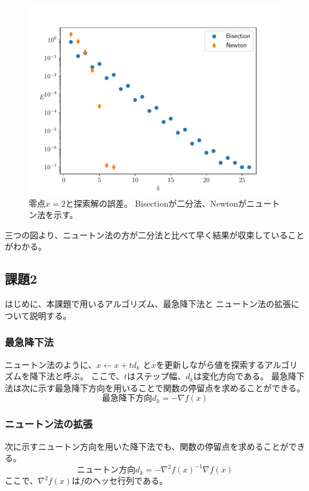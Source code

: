 \documentclass[a4j, titlepage]{jsarticle}
\numberwithin{equation}{section}
\begin{document}
            \begin{figure}[h]
                \centering
                \includegraphics[width=0.8\hsize]{kadai1/change2.pdf}
                \caption{
                    零点$x=2$と探索解の誤差。
                    Bisectionが二分法、Newtonがニュートン法を示す。
                }
                \label{fig:1fe2}
            \end{figure}

            三つの図より、ニュートン法の方が二分法と比べて早く結果が収束していることがわかる。

    \subsection{課題2} \label{sec:kadai2}
        はじめに、本課題で用いるアルゴリズム、最急降下法と
        ニュートン法の拡張について説明する。

        \subsubsection{最急降下法}
            ニュートン法のように、$x\leftarrow x+td_k$
            と$x$を更新しながら値を探索するアルゴリズムを降下法と呼ぶ。
            ここで、$t$はステップ幅、$d_k$は変化方向である。
            最急降下法は次に示す最急降下方向を用いることで関数の停留点を求めることができる。
            \begin{equation*}
                最急降下方向 d_k=-\nabla f(x)
            \end{equation*}

        \subsubsection{ニュートン法の拡張}
            次に示すニュートン方向を用いた降下法でも、関数の停留点を求めることができる。
            \begin{equation*}
                ニュートン方向 d_k=-\nabla^2f(x)^{-1}\nabla f(x)
            \end{equation*}
            ここで、$\nabla^2f(x)$は$f$のヘッセ行列である。
\end{document}
